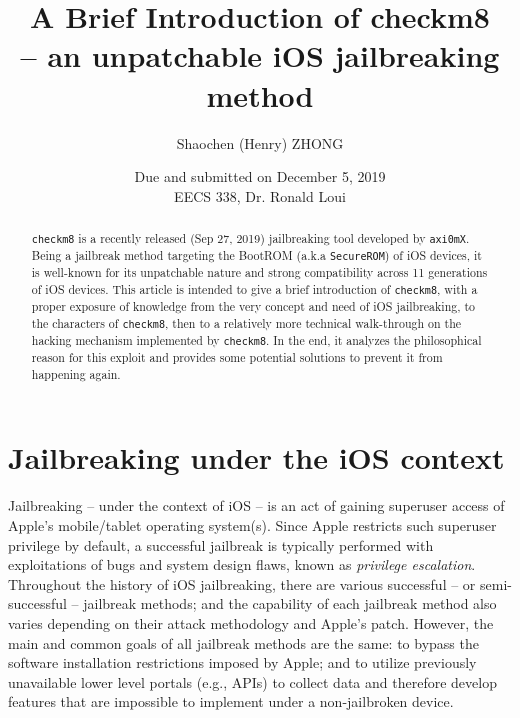 \documentclass[10pt]{article}
\newcommand{\inlinecode}{\texttt}
\begin{document}
\linespread{1}


\title{\textbf{A Brief Introduction of checkm8} \\
        \large \textbf{-- an unpatchable iOS jailbreaking method\\}}

\author{Shaochen (Henry) ZHONG}
\date{Due and submitted on December 5, 2019\\EECS 338, Dr. Ronald Loui}
\maketitle

\begin{abstract}
    \inlinecode{checkm8} is a recently released (Sep 27, 2019) jailbreaking tool developed by \inlinecode{axi0mX}. Being a jailbreak method targeting the BootROM (a.k.a \inlinecode{SecureROM}) of iOS devices, it is well-known for its unpatchable nature and strong compatibility across 11 generations of iOS devices. This article is intended to give a brief introduction of \inlinecode{checkm8}, with a proper exposure of knowledge from the very concept and need of iOS jailbreaking, to the characters of \inlinecode{checkm8}, then to a relatively more technical walk-through on the hacking mechanism implemented by \inlinecode{checkm8}. In the end, it analyzes the philosophical reason for this exploit and provides some potential solutions to prevent it from happening again.
\end{abstract}





\vspace{0.5cm}
{\hypersetup{hidelinks}
\tableofcontents
}


\newpage

\section{Jailbreaking under the iOS context}

Jailbreaking -- under the context of iOS -- is an act of gaining superuser access of Apple's mobile/tablet operating system(s). Since Apple restricts such superuser privilege by default, a successful jailbreak is typically performed with exploitations of bugs and system design flaws, known as \textit{privilege escalation}. Throughout the history of iOS jailbreaking, there are various successful -- or semi-successful -- jailbreak methods; and the capability of each jailbreak method also varies depending on their attack methodology and Apple's patch. However, the main and common goals of all jailbreak methods are the same: to bypass the software installation restrictions imposed by Apple; and to utilize previously unavailable lower level portals (e.g., APIs) to collect data and therefore develop features that are impossible to implement under a non-jailbroken device.
\end{document}
